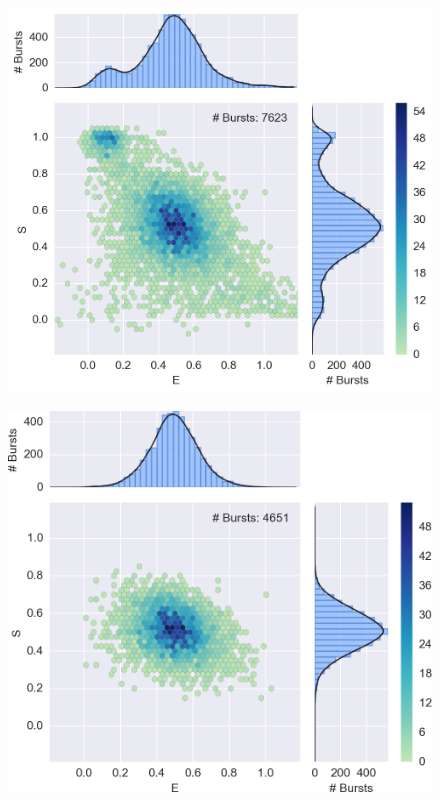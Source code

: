 \begin{figure}
\begin{center}
\includegraphics[width=\singlefig]{"figures/alex_jointplot/alex_jointplot"}
\caption[]{}
\end{center}
\end{figure}

\begin{figure}
\begin{center}
\includegraphics[width=\singlefig]{"figures/alex_jointplot_fretsel/alex_jointplot_fretsel"}
\caption[]{}
\end{center}
\end{figure}

